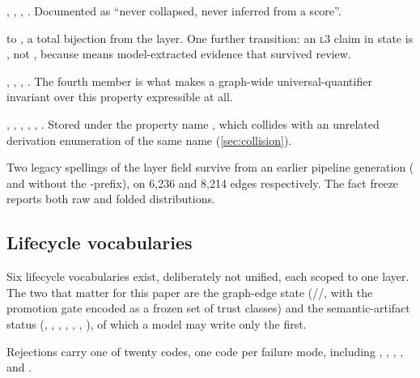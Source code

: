 \begin{description}[leftmargin=1.6em,itemsep=2pt,topsep=3pt,style=nextline]
\item[\code{KnowledgeLayer}] , ,
, . Documented as ``never
collapsed, never inferred from a score''.
\item[\code{QualityTier}]  to , a total bijection from the
layer. One further transition: an \textsc{l3} claim in state  is
, not , because  means model-extracted
evidence that survived review.
\item[\code{AttributionPrecision}] ,
, , .
The fourth member is what makes a graph-wide universal-quantifier invariant over this
property expressible at all.
\item[Evidence surface] , , ,
, , . Stored under
the property name , which collides with an unrelated derivation
enumeration of the same name (\cref{sec:collision}).
\end{description}

Two legacy spellings of the layer field survive from an earlier pipeline generation
( and  without the
-prefix), on 6{,}236 and 8{,}214 edges respectively. The fact freeze reports
both raw and folded distributions.

\subsection{Lifecycle vocabularies}

Six lifecycle vocabularies exist, deliberately not unified, each scoped to one layer.
The two that matter for this paper are the graph-edge state
(//, with the promotion gate encoded as
a frozen set of trust classes) and the semantic-artifact status
(, , ,
, , ,
), of which a model may write only the first.

Rejections carry one of twenty codes, one code per failure mode, including
, ,
, ,
 and .

